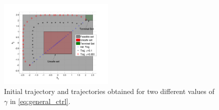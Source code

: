 \begin{figure}[t]
\centering
\includegraphics[width=0.49\textwidth]{figures/ToyExampleControl}
\vspace{-30pt}
\caption{{\small Initial trajectory and trajectories obtained for two different values of $\gamma$ in \eqref{eq:general_ctrl}.}}
\label{fig:toy control}
\vspace{-10pt}
\end{figure}